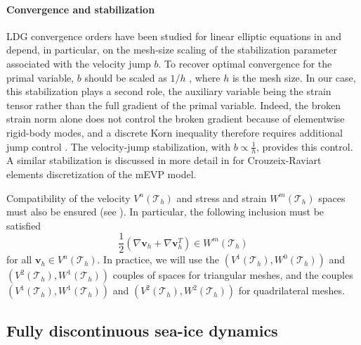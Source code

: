 \documentclass[11pt]{article}
\newcommand{\bv}{\mathbf{v}}
\begin{document}
\paragraph{Convergence and stabilization}
LDG convergence orders have been studied for linear elliptic equations in \cite{castillo2000priori} and depend, in particular, on the mesh-size scaling of the stabilization parameter associated with the velocity jump $b$. To recover optimal convergence for the primal variable, $b$ should be scaled as $1/h$ \cite{castillo2000priori}, where $h$ is the mesh size. In our case, this stabilization plays a second role, the auxiliary variable being the strain tensor rather than the full gradient of the primal variable. Indeed, the broken strain norm alone does not control the broken gradient because of elementwise rigid-body modes, and a discrete Korn inequality therefore requires additional jump control \cite{hansbo2003discontinuous}. The velocity-jump stabilization, with $b \propto \frac{1}{h}$, provides this control. A similar stabilization is discussed in more detail in \cite{Mehlmann2021} for Crouzeix-Raviart elements discretization of the mEVP model.


Compatibility of the velocity $V^n(\mathcal{T}_h)$ and stress and strain $W^m(\mathcal{T}_h)$ spaces must also be ensured (see \cite{richter2023dynamical}). In particular, the following inclusion must be satisfied
$$\frac12 \left(\nabla \bv_{h} + \nabla \bv_{h} ^T \right) \in W^m(\mathcal{T}_h)
$$ for all $\bv_h \in V^n(\mathcal{T}_h)$. In practice, we will use the $\left (V^1(\mathcal{T}_h), W^0(\mathcal{T}_h)\right )$ and $\left (V^2(\mathcal{T}_h), W^1(\mathcal{T}_h) \right )$ couples of spaces for triangular meshes, and the couples  $\left (V^1(\mathcal{T}_h), W^1(\mathcal{T}_h)   \right )$ and $\left (V^2(\mathcal{T}_h), W^2(\mathcal{T}_h) \right )$ for quadrilateral meshes. \label{sec:compatibility}






\subsection{Fully discontinuous sea-ice dynamics}
\end{document}
